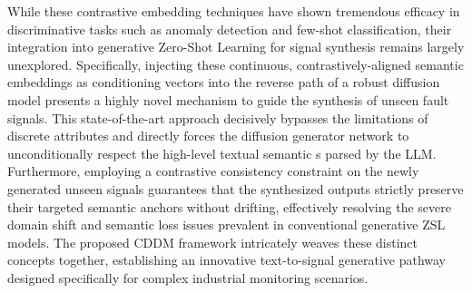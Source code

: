 While these contrastive embedding techniques have shown tremendous efficacy in discriminative tasks such as anomaly detection and few-shot classification, their integration into generative Zero-Shot Learning for signal synthesis remains largely unexplored. Specifically, injecting these continuous, contrastively-aligned semantic \cite{mikolov2013efficient} embeddings as conditioning vectors into the reverse path of a robust diffusion model presents a highly novel mechanism to guide the synthesis of unseen fault signals. This state-of-the-art approach decisively bypasses the limitations of discrete attributes and directly forces the diffusion generator network to unconditionally respect the high-level textual semantic \cite{radford2021learning}s parsed by the LLM. Furthermore, employing a contrastive consistency constraint on the newly generated unseen signals guarantees that the synthesized outputs strictly preserve their targeted semantic anchors without drifting, effectively resolving the severe domain shift and semantic loss issues prevalent in conventional generative ZSL models. The proposed CDDM framework intricately weaves these distinct concepts together, establishing an innovative text-to-signal generative pathway designed specifically for complex industrial monitoring scenarios.
